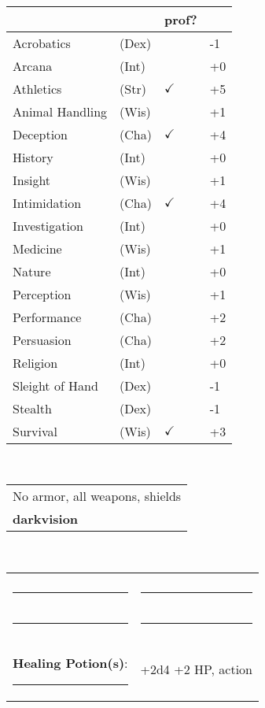 \documentclass[twocolumn]{article}
\begin{document}
\\
\noindent\begin{tabular}{llll}
 & & prof? & \\
\hline
Acrobatics & (Dex) &  & -1 \\
Arcana & (Int) &  & +0 \\ 
Athletics & (Str) & $\checkmark$ & +5\\
Animal Handling & (Wis) &  & +1\\
Deception & (Cha) & $\checkmark$ & +4\\
History & (Int) &  & +0 \\
Insight & (Wis) &  & +1 \\
Intimidation & (Cha) & $\checkmark$ & +4 \\
Investigation & (Int) &  & +0 \\
Medicine & (Wis) &  & +1 \\
Nature & (Int) &  & +0 \\
Perception & (Wis) &  & +1 \\
Performance & (Cha) &  & +2 \\
Persuasion & (Cha) &  & +2 \\
Religion & (Int) &  & +0 \\
Sleight of Hand & (Dex) &  & -1 \\
Stealth & (Dex) &  & -1 \\
Survival & (Wis) & $\checkmark$ & +3 \\
\hline
\end{tabular}
\vspace{12pt}

\\
\noindent\begin{tabular}{|m{3.1in}|}
\hline
No armor, all weapons, shields \\
\textbf{darkvision} \\
\hline
\end{tabular}
\vspace{12pt}


\\
\noindent\begin{tabular}{|ll|}
\hline&\\
\rule{1.4in}{.2pt}&\rule{1.4in}{.2pt}\\
\rule{1.4in}{.2pt}&\rule{1.4in}{.2pt}\\
\textbf{Healing Potion(s)}: \rule{.2in}{.2pt}& +2d4 +2 HP, {\sc action}\\
\hline
\end{tabular}
\vspace{12pt}
\end{document}
